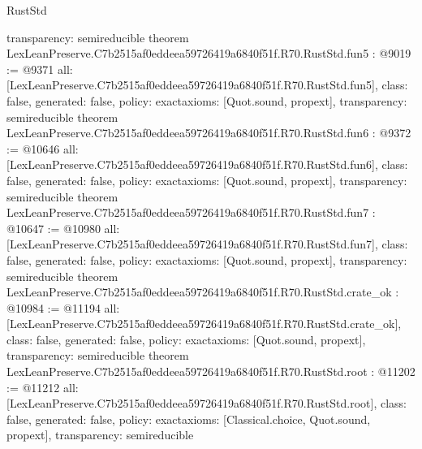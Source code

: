\begin{lexlean}{RustStd}
\begin{coremodule}
{  transparency: semireducible
}
theorem LexLeanPreserve.C7b2515af0eddeea59726419a6840f51f.R70.RustStd.fun5 : @9019 := @9371 {
  all: [LexLeanPreserve.C7b2515af0eddeea59726419a6840f51f.R70.RustStd.fun5],
  class: false,
  generated: false,
  policy: exact{axioms: [Quot.sound, propext]},
  transparency: semireducible
}
theorem LexLeanPreserve.C7b2515af0eddeea59726419a6840f51f.R70.RustStd.fun6 : @9372 := @10646 {
  all: [LexLeanPreserve.C7b2515af0eddeea59726419a6840f51f.R70.RustStd.fun6],
  class: false,
  generated: false,
  policy: exact{axioms: [Quot.sound, propext]},
  transparency: semireducible
}
theorem LexLeanPreserve.C7b2515af0eddeea59726419a6840f51f.R70.RustStd.fun7 : @10647 := @10980 {
  all: [LexLeanPreserve.C7b2515af0eddeea59726419a6840f51f.R70.RustStd.fun7],
  class: false,
  generated: false,
  policy: exact{axioms: [Quot.sound, propext]},
  transparency: semireducible
}
theorem LexLeanPreserve.C7b2515af0eddeea59726419a6840f51f.R70.RustStd.crate_ok : @10984 := @11194 {
  all: [LexLeanPreserve.C7b2515af0eddeea59726419a6840f51f.R70.RustStd.crate_ok],
  class: false,
  generated: false,
  policy: exact{axioms: [Quot.sound, propext]},
  transparency: semireducible
}
theorem LexLeanPreserve.C7b2515af0eddeea59726419a6840f51f.R70.RustStd.root : @11202 := @11212 {
  all: [LexLeanPreserve.C7b2515af0eddeea59726419a6840f51f.R70.RustStd.root],
  class: false,
  generated: false,
  policy: exact{axioms: [Classical.choice, Quot.sound, propext]},
  transparency: semireducible
}


\end{coremodule}
\end{lexlean}
